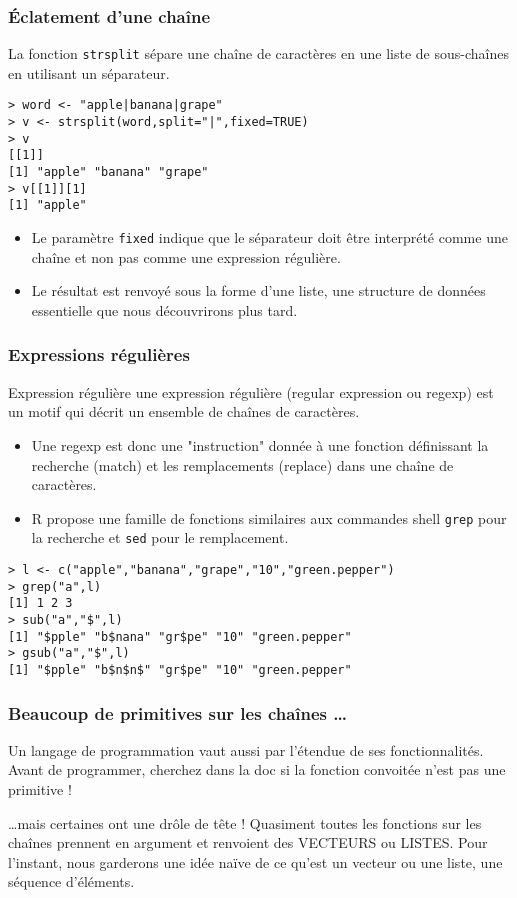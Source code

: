 \documentclass[10pt]{beamer}
\begin{document}
\begin{frame}[fragile]
  \frametitle{Éclatement d’une chaîne}
La fonction \alert{\texttt{strsplit}} sépare une chaîne de caractères en une liste de sous-chaînes en utilisant un séparateur.
\begin{lstlisting}
> word <- "apple|banana|grape"
> v <- strsplit(word,split="|",fixed=TRUE)
> v
[[1]]
[1] "apple" "banana" "grape"
> v[[1]][1]
[1] "apple"
\end{lstlisting}

\begin{itemize}
\item Le paramètre \texttt{fixed} indique que le séparateur doit être interprété comme une chaîne et non pas comme une expression régulière.
\item Le résultat est renvoyé sous la forme d’une liste, une structure de données essentielle que nous découvrirons plus tard.
\end{itemize}
\end{frame}
\begin{frame}[fragile]
  \frametitle{Expressions régulières}
  \begin{alertblock}{Expression régulière}
    une expression régulière (regular expression ou regexp) est un motif qui décrit un ensemble de chaînes de caractères. \\
\end{alertblock}
\begin{itemize}
\item Une regexp est donc une "instruction" donnée à une fonction définissant la recherche (match) et les remplacements (replace) dans une chaîne de caractères.
\item R propose une famille de fonctions similaires aux commandes shell \texttt{grep} pour la recherche et \texttt{sed} pour le remplacement.
\end{itemize}
\begin{lstlisting}
> l <- c("apple","banana","grape","10","green.pepper")
> grep("a",l)
[1] 1 2 3
> sub("a","$",l)
[1] "$pple" "b$nana" "gr$pe" "10" "green.pepper"
> gsub("a","$",l)
[1] "$pple" "b$n$n$" "gr$pe" "10" "green.pepper"
\end{lstlisting}
\end{frame}

\begin{frame}
  \frametitle{Beaucoup de primitives sur les chaînes \dots}
  Un langage de programmation vaut aussi par l'étendue de ses fonctionnalités.
  Avant de programmer, cherchez dans la doc si la fonction convoitée n'est pas une primitive !

  \begin{block}{\dots mais certaines ont une drôle de tête !}
    Quasiment toutes les fonctions sur les chaînes prennent en argument et renvoient des VECTEURS ou LISTES.
    Pour l'instant, nous garderons une idée naïve de ce qu'est un vecteur ou une liste, une séquence d’éléments.
  \end{block}

\end{frame}
\end{document}
